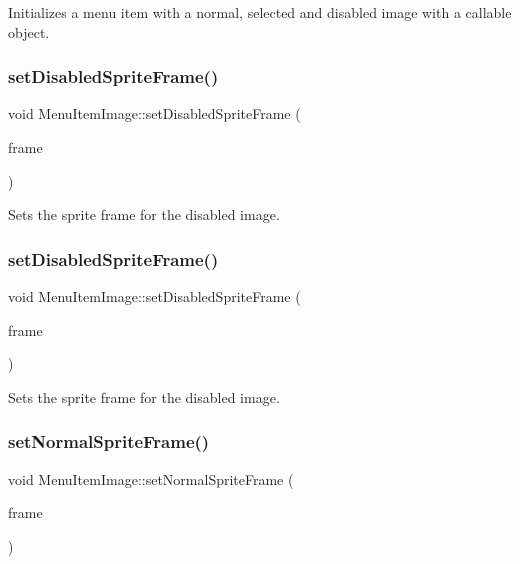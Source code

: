 Initializes a menu item with a normal, selected and disabled image with a callable object. \mbox{\label{classMenuItemImage_a3ca7c47c67c831ff698eecf4e7e7ce86}} 
\subsubsection{\texorpdfstring{set\+Disabled\+Sprite\+Frame()}{setDisabledSpriteFrame()}\hspace{0.1cm}{\footnotesize\ttfamily [1/2]}}
{\footnotesize\ttfamily void Menu\+Item\+Image\+::set\+Disabled\+Sprite\+Frame (\begin{DoxyParamCaption}\item[{\hyperlink{classSpriteFrame}{Sprite\+Frame} $\ast$}]{frame }\end{DoxyParamCaption})}

Sets the sprite frame for the disabled image. \mbox{\label{classMenuItemImage_a3ca7c47c67c831ff698eecf4e7e7ce86}} 
\subsubsection{\texorpdfstring{set\+Disabled\+Sprite\+Frame()}{setDisabledSpriteFrame()}\hspace{0.1cm}{\footnotesize\ttfamily [2/2]}}
{\footnotesize\ttfamily void Menu\+Item\+Image\+::set\+Disabled\+Sprite\+Frame (\begin{DoxyParamCaption}\item[{\hyperlink{classSpriteFrame}{Sprite\+Frame} $\ast$}]{frame }\end{DoxyParamCaption})}

Sets the sprite frame for the disabled image. \mbox{\label{classMenuItemImage_ac85fee9b02f2199a96d52ddf14a1ae89}} 
\subsubsection{\texorpdfstring{set\+Normal\+Sprite\+Frame()}{setNormalSpriteFrame()}\hspace{0.1cm}{\footnotesize\ttfamily [1/2]}}
{\footnotesize\ttfamily void Menu\+Item\+Image\+::set\+Normal\+Sprite\+Frame (\begin{DoxyParamCaption}\item[{\hyperlink{classSpriteFrame}{Sprite\+Frame} $\ast$}]{frame }\end{DoxyParamCaption})}


